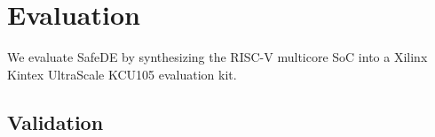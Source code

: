 \section{Evaluation}
\label{sec:eval}

We evaluate SafeDE by synthesizing the RISC-V multicore SoC into a Xilinx Kintex UltraScale KCU105 evaluation kit.

\subsection{Validation}



